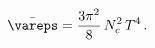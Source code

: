 \begin{equation}
  \label{eq:dual energy density}
  \bar\vareps = \frac{3\pi^2}{8} \, N_c^2 \, T^4 \,.
\end{equation}

